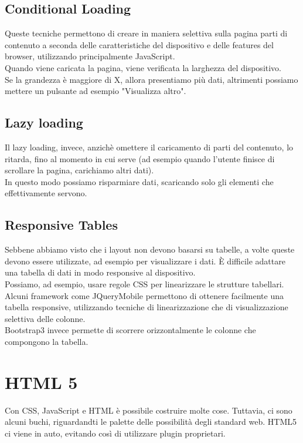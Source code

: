 \documentclass{article}
\begin{document}
\subsection{Conditional Loading}
Queste tecniche permettono di creare in maniera selettiva sulla pagina parti di contenuto a seconda delle caratteristiche del dispositivo e delle features del browser, utilizzando principalmente JavaScript.\\
Quando viene caricata la pagina, viene verificata la larghezza del dispositivo.\\
Se la grandezza è maggiore di X, allora presentiamo più dati, altrimenti possiamo mettere un pulsante ad esempio "Visualizza altro".
\subsection{Lazy loading}
Il lazy loading, invece, anzichè omettere il caricamento di parti del contenuto, lo ritarda, fino al momento in cui serve (ad esempio quando l'utente finisce di scrollare la pagina, carichiamo altri dati).\\
In questo modo possiamo risparmiare dati, scaricando solo gli elementi che effettivamente servono.
\subsection{Responsive Tables}
Sebbene abbiamo visto che i layout non devono basarsi su tabelle, a volte queste devono essere utilizzate, ad esempio per visualizzare i dati. È difficile adattare una tabella di dati in modo responsive al dispositivo.\\
Possiamo, ad esempio, usare regole CSS per linearizzare le strutture tabellari. Alcuni framework come JQueryMobile permettono di ottenere facilmente una tabella responsive, utilizzando tecniche di linearizzazione che di visualizzazione selettiva delle colonne.\\
Bootstrap3 invece permette di scorrere orizzontalmente le colonne che compongono la tabella.
\section{HTML 5}
Con CSS, JavaScript e HTML è possibile costruire molte cose. Tuttavia, ci sono alcuni buchi, riguardandti le palette delle possibilità degli standard web. HTML5 ci viene in auto, evitando così di utilizzare plugin proprietari.
\end{document}
